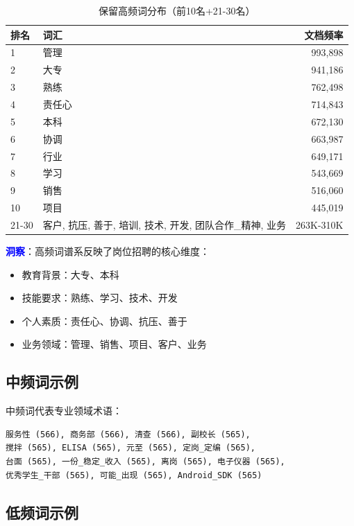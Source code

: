 \documentclass[11pt,a4paper]{article}
\begin{document}
\begin{table}[h]
\centering
\begin{tabular}{llr}
\toprule
\textbf{排名} & \textbf{词汇} & \textbf{文档频率} \\
\midrule
1 & 管理 & 993,898 \\
2 & 大专 & 941,186 \\
3 & 熟练 & 762,498 \\
4 & 责任心 & 714,843 \\
5 & 本科 & 672,130 \\
6 & 协调 & 663,987 \\
7 & 行业 & 649,171 \\
8 & 学习 & 543,669 \\
9 & 销售 & 516,060 \\
10 & 项目 & 445,019 \\
\midrule
21-30 & 客户, 抗压, 善于, 培训, 技术, 开发, 团队合作\_精神, 业务 & 263K-310K \\
\bottomrule
\end{tabular}
\caption{保留高频词分布（前10名+21-30名）}
\end{table}

\textcolor{blue}{\textbf{洞察}}：高频词谱系反映了岗位招聘的核心维度：
\begin{itemize}
    \item 教育背景：大专、本科
    \item 技能要求：熟练、学习、技术、开发
    \item 个人素质：责任心、协调、抗压、善于
    \item 业务领域：管理、销售、项目、客户、业务
\end{itemize}

\subsection{中频词示例}

中频词代表专业领域术语：

\begin{verbatim}
服务性 (566), 商务部 (566), 清查 (566), 副校长 (565),
搅拌 (565), ELISA (565), 元至 (565), 定岗_定编 (565),
台面 (565), 一份_稳定_收入 (565), 离岗 (565), 电子仪器 (565),
优秀学生_干部 (565), 可能_出现 (565), Android_SDK (565)
\end{verbatim}

\subsection{低频词示例}
\end{document}
